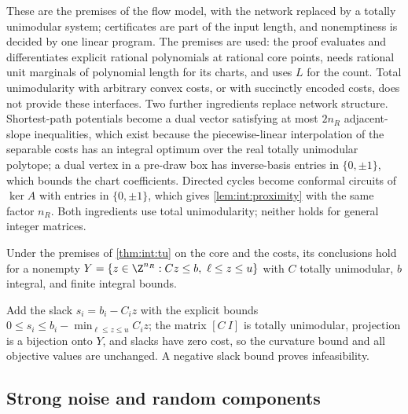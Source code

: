 These are the premises of the flow model, with the network replaced by a
totally unimodular system; certificates are part of the input length, and
nonemptiness is decided by one linear program. The premises are used: the
proof evaluates and differentiates explicit rational polynomials at rational
core points, needs rational unit marginals of polynomial length for its
charts, and uses $L$ for the count. Total unimodularity with arbitrary convex
costs, or with succinctly encoded costs, does not provide these interfaces.
Two further ingredients replace network structure. Shortest-path potentials
become a dual vector satisfying at most $2n_R$ adjacent-slope inequalities,
which exist because the piecewise-linear interpolation of the separable costs
has an integral optimum over the real totally unimodular polytope; a dual
vertex in a pre-draw box has inverse-basis entries in $\{0,\pm1\}$, which
bounds the chart coefficients. Directed cycles become conformal circuits of
$\ker A$ with entries in $\{0,\pm1\}$, which gives \cref{lem:int:proximity}
with the same factor $n_R$. Both ingredients use total unimodularity; neither
holds for general integer matrices.

\begin{corollary}\label{cor:int:tu-ineq}
Under the premises of \cref{thm:int:tu} on the core and the costs, its
conclusions hold for a nonempty
$Y=\{z\in\Z^{n_R}:Cz\le b,\ \ell\le z\le u\}$ with $C$ totally unimodular, $b$
integral, and finite integral bounds.
\end{corollary}

Add the slack $s_i=b_i-C_iz$ with the explicit bounds
$0\le s_i\le b_i-\min_{\ell\le z\le u}C_iz$; the matrix $[C\ I]$ is totally
unimodular, projection is a bijection onto $Y$, and slacks have zero cost, so
the curvature bound and all objective values are unchanged. A negative slack
bound proves infeasibility.

\subsection{Strong noise and random components}\label{sec:int:strong-field}

